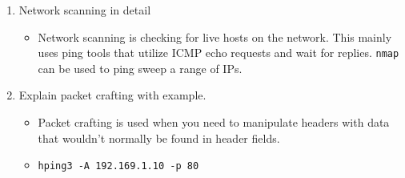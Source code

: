 \begin{enumerate}
    \item Network scanning in detail
    \begin{itemize}
        \item Network scanning is checking for live hosts on the network.
        This mainly uses ping tools that utilize ICMP echo requests and wait for replies. \verb|nmap| can be used to ping sweep a range of IPs.
    \end{itemize}
    \item Explain packet crafting with example.
    \begin{itemize}
        \item Packet crafting is used when you need to manipulate headers with data that wouldn't normally be found in header fields.
        \item \verb|hping3 -A 192.169.1.10 -p 80|
    \end{itemize}
\end{enumerate}